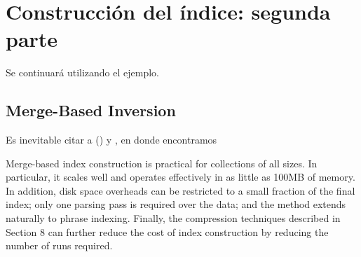\section{Construcción del índice: segunda parte}

Se continuará utilizando el ejemplo.

\subsection{Merge-Based Inversion}

Es inevitable citar a \citet[p. ~14]{Zobel06invertedfiles} (\citeyear{Zobel06invertedfiles}) y \citet[p.~238]{WittenMoffatBell99} \citeyear{WittenMoffatBell99}, en donde encontramos

Merge-based index construction is practical for collections of all sizes. In particular,
it scales well and operates effectively in as little as 100MB of memory. In addition, disk
space overheads can be restricted to a small fraction of the final index; only one parsing
pass is required over the data; and the method extends naturally to phrase indexing.
Finally, the compression techniques described in Section 8 can further reduce the cost
of index construction by reducing the number of runs required.




